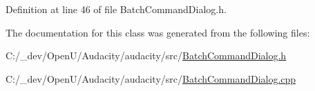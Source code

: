 Definition at line 46 of file Batch\+Command\+Dialog.\+h.



The documentation for this class was generated from the following files\+:\begin{DoxyCompactItemize}
\item 
C\+:/\+\_\+dev/\+Open\+U/\+Audacity/audacity/src/\hyperlink{_batch_command_dialog_8h}{Batch\+Command\+Dialog.\+h}\item 
C\+:/\+\_\+dev/\+Open\+U/\+Audacity/audacity/src/\hyperlink{_batch_command_dialog_8cpp}{Batch\+Command\+Dialog.\+cpp}\end{DoxyCompactItemize}
